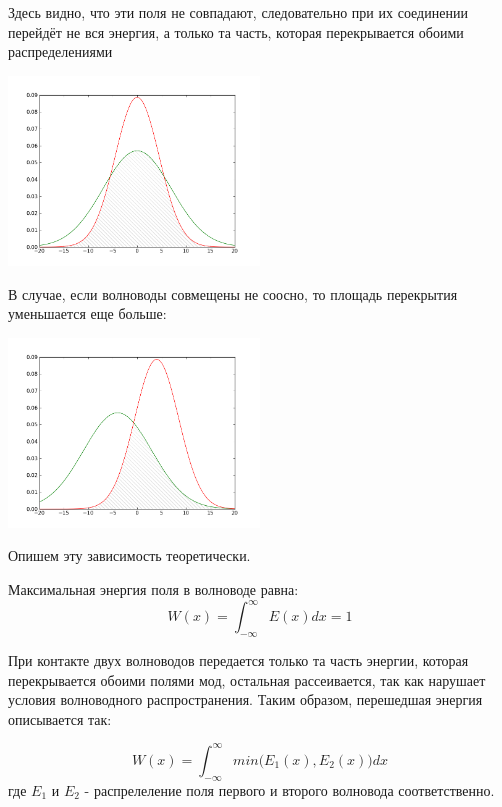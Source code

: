 Здесь видно, что эти поля не совпадают, следовательно при их соединении перейдёт не вся энергия, а только та часть, которая перекрывается обоими распределениями

\includegraphics[width=0.5\textwidth]{img/intersection.png}

В случае, если волноводы совмещены не соосно, то площадь перекрытия уменьшается еще больше:

\includegraphics[width=0.5\textwidth]{img/intersection2.png}

Опишем эту зависимость теоретически.

Максимальная энергия поля в волноводе равна:
\begin{equation}
	W(x) = \int_{-\infty}^{\infty}E(x)dx = 1
\end{equation}

При контакте двух волноводов передается только та часть энергии, которая перекрывается обоими полями мод, остальная рассеивается, так как нарушает условия волноводного распространения. Таким образом, перешедшая энергия описывается так:

\begin{equation}
	\label{transition}
	W(x) = \int_{-\infty}^{\infty}min\bigl(E_1(x), E_2(x)\bigr)dx
\end{equation}
где $E_1$ и $E_2$ - распрелеление поля первого и второго волновода соответственно.

